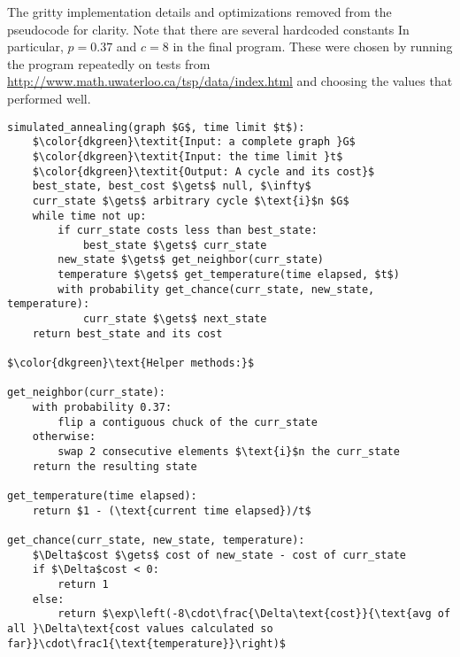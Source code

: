 \documentclass[11pt,letterpaper]{article}
\begin{document}
The gritty implementation details and optimizations removed from the pseudocode for clarity. Note that there are several hardcoded constants In particular, $p=0.37$ and $c=8$ in the final program. These were chosen by running the program repeatedly on tests from \url{http://www.math.uwaterloo.ca/tsp/data/index.html} and choosing the values that performed well.
\begin{lstlisting}
simulated_annealing(graph $G$, time limit $t$):
	$\color{dkgreen}\textit{Input: a complete graph }G$
	$\color{dkgreen}\textit{Input: the time limit }t$
	$\color{dkgreen}\textit{Output: A cycle and its cost}$
	best_state, best_cost $\gets$ null, $\infty$
	curr_state $\gets$ arbitrary cycle $\text{i}$n $G$
	while time not up:
		if curr_state costs less than best_state:
			best_state $\gets$ curr_state
		new_state $\gets$ get_neighbor(curr_state)
		temperature $\gets$ get_temperature(time elapsed, $t$)
		with probability get_chance(curr_state, new_state, temperature):
			curr_state $\gets$ next_state
	return best_state and its cost

$\color{dkgreen}\text{Helper methods:}$

get_neighbor(curr_state):
	with probability 0.37:
		flip a contiguous chuck of the curr_state
	otherwise:
		swap 2 consecutive elements $\text{i}$n the curr_state
	return the resulting state

get_temperature(time elapsed):
	return $1 - (\text{current time elapsed})/t$

get_chance(curr_state, new_state, temperature):
	$\Delta$cost $\gets$ cost of new_state - cost of curr_state
	if $\Delta$cost < 0:
		return 1
	else:
		return $\exp\left(-8\cdot\frac{\Delta\text{cost}}{\text{avg of all }\Delta\text{cost values calculated so far}}\cdot\frac1{\text{temperature}}\right)$

\end{lstlisting}
\end{document}
